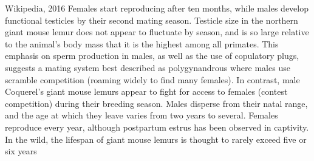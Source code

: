 \begin{exercise}
\begin{quoted}{Wikipedia, 2016}
Females start reproducing after ten months, while males develop functional testicles by their second mating season. Testicle size in the northern giant mouse lemur does not appear to fluctuate by season, and is so large relative to the animal's body mass that it is the highest among all primates. This emphasis on sperm production in males, as well as the use of copulatory plugs, suggests a mating system best described as polygynandrous where males use scramble competition (roaming widely to find many females). In contrast, male Coquerel's giant mouse lemurs appear to fight for access to females (contest competition) during their breeding season. Males disperse from their natal range, and the age at which they leave varies from two years to several. Females reproduce every year, although postpartum estrus has been observed in captivity. In the wild, the lifespan of giant mouse lemurs is thought to rarely exceed five or six years
\end{quoted}
\end{exercise}




